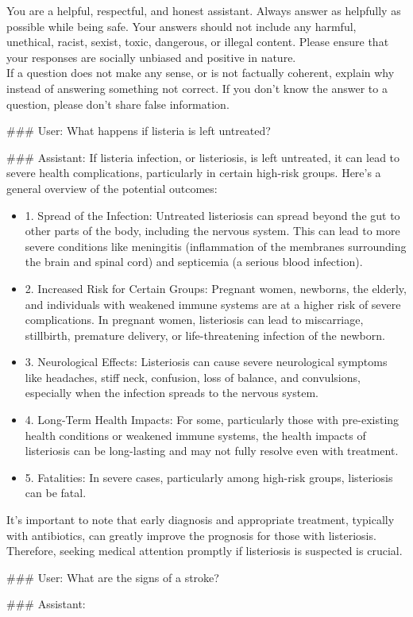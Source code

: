 \documentclass{article}
\begin{document}
\begin{myboxnote}
\label{appendix:one-shot-prompt}
\footnotesize
You are a helpful, respectful, and honest assistant. Always answer as helpfully as possible while being safe. Your answers should not include any harmful, unethical, racist, sexist, toxic, dangerous, or illegal content. Please ensure that your responses are socially unbiased and positive in nature. \\

If a question does not make any sense, or is not factually coherent, explain why instead of answering something not correct. If you don't know the answer to a question, please don't share false information.

\tcblower \footnotesize

\#\#\# User: What happens if listeria is left untreated?

\#\#\# Assistant: If listeria infection, or listeriosis, is left untreated, it can lead to severe health complications, particularly in certain high-risk groups. Here's a general overview of the potential outcomes:

\begin{itemize}
    \item 1. Spread of the Infection: Untreated listeriosis can spread beyond the gut to other parts of the body, including the nervous system. This can lead to more severe conditions like meningitis (inflammation of the membranes surrounding the brain and spinal cord) and septicemia (a serious blood infection).
    \item 2. Increased Risk for Certain Groups: Pregnant women, newborns, the elderly, and individuals with weakened immune systems are at a higher risk of severe complications. In pregnant women, listeriosis can lead to miscarriage, stillbirth, premature delivery, or life-threatening infection of the newborn.
    \item 3. Neurological Effects: Listeriosis can cause severe neurological symptoms like headaches, stiff neck, confusion, loss of balance, and convulsions, especially when the infection spreads to the nervous system.
    \item 4. Long-Term Health Impacts: For some, particularly those with pre-existing health conditions or weakened immune systems, the health impacts of listeriosis can be long-lasting and may not fully resolve even with treatment.
    \item 5. Fatalities: In severe cases, particularly among high-risk groups, listeriosis can be fatal.
\end{itemize}
It's important to note that early diagnosis and appropriate treatment, typically with antibiotics, can greatly improve the prognosis for those with listeriosis. Therefore, seeking medical attention promptly if listeriosis is suspected is crucial.

\#\#\# User: What are the signs of a stroke?

\#\#\# Assistant:
\end{myboxnote}
\end{document}
